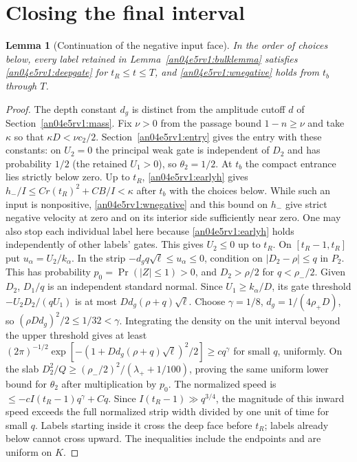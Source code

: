 \documentclass[11pt]{article}
\newtheorem{lemma}{Lemma}
\begin{document}
\section{Closing the final interval}\label{an04e5rv1:centered}
\begin{lemma}[Continuation of the negative input face]\label{an04e5rv1:gatelemma}
In the order of choices below, every label retained in Lemma~\ref{an04e5rv1:bulklemma} satisfies \eqref{an04e5rv1:deepgate} for $t_R\le t\le T$, and \eqref{an04e5rv1:wnegative} holds from $t_b$ through $T$.
\end{lemma}
\begin{proof}
The depth constant $d_g$ is distinct from the amplitude cutoff $d$ of Section~\ref{an04e5rv1:mass}. Fix $\nu>0$ from the passage bound $1-n\ge\nu$ and take $\kappa$ so that $\kappa D<\nu c_2/2$. Section~\ref{an04e5rv1:entry} gives the entry with these constants: on $U_2=0$ the principal weak gate is independent of $D_2$ and has probability $1/2$ (the retained $U_1>0$), so $\theta_2=1/2$. At $t_b$ the compact entrance lies strictly below zero. Up to $t_R$, \eqref{an04e5rv1:earlyh} gives $h_-/I\le C r(t_R)^2+CB/I<\kappa$ after $t_b$ with the choices below. While such an input is nonpositive, \eqref{an04e5rv1:wnegative} and this bound on $h_-$ give strict negative velocity at zero and on its interior side sufficiently near zero. One may also stop each individual label here because \eqref{an04e5rv1:earlyh} holds independently of other labels' gates. This gives $U_2\le0$ up to $t_R$. On $[t_R-1,t_R]$ put $u_\alpha=U_2/k_\alpha$. In the strip $-d_gq\sqrt\ell\le u_\alpha\le0$, condition on $|D_2-\rho|\le q$ in $P_2$. This has probability $p_0=\Pr(|Z|\le1)>0$, and $D_2>\rho/2$ for $q<\rho_-/2$. Given $D_2$, $D_1/q$ is an independent standard normal. Since $U_1\ge k_\alpha/D$, its gate threshold $-U_2D_2/(qU_1)$ is at most $D d_g(\rho+q)\sqrt\ell$. Choose $\gamma=1/8$, $d_g=1/(4\rho_+D)$, so $(\rho D d_g)^2/2\le1/32<\gamma$. Integrating the density on the unit interval beyond the upper threshold gives at least $(2\pi)^{-1/2}\exp[-(1+Dd_g(\rho+q)\sqrt\ell)^2/2]\ge c q^\gamma$ for small $q$, uniformly. On the slab $D_2^2/Q\ge(\rho_-/2)^2/(\lambda_++1/100)$, proving the same uniform lower bound for $\theta_2$ after multiplication by $p_0$. The normalized speed is $\le-c I(t_R-1)q^\gamma+Cq$. Since $I(t_R-1)\gg q^{3/4}$, the magnitude of this inward speed exceeds the full normalized strip width divided by one unit of time for small $q$. Labels starting inside it cross the deep face before $t_R$; labels already below cannot cross upward. The inequalities include the endpoints and are uniform on $K$.


\end{proof}
\end{document}
